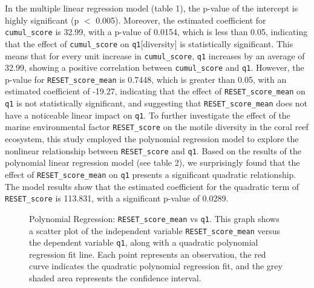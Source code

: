 \documentclass[a4paper, 11]{article}
\begin{document}
In the multiple linear regression model (table 1), the p-value of the intercept is highly significant (p $<$ 0.005). Moreover, the estimated coefficient for \texttt{cumul\_score} is 32.99, with a p-value of 0.0154, which is less than 0.05, indicating that the effect of \texttt{cumul\_score} on \texttt{q1}[diversity] is statistically significant. This means that for every unit increase in \texttt{cumul\_score}, \texttt{q1} increases by an average of 32.99, showing a positive correlation between \texttt{cumul\_score} and \texttt{q1}. However, the p-value for \texttt{RESET\_score\_mean} is 0.7448, which is greater than 0.05, with an estimated coefficient of -19.27, indicating that the effect of \texttt{RESET\_score\_mean} on \texttt{q1} is not statistically significant, and suggesting that \texttt{RESET\_score\_mean} does not have a noticeable linear impact on \texttt{q1}. 
To further investigate the effect of the marine environmental factor \texttt{RESET\_score} on the motile diversity in the coral reef ecosystem, this study employed the polynomial regression model to explore the nonlinear relationship between \texttt{RESET\_score} and \texttt{q1}. Based on the results of the polynomial linear regression model (see table 2), we surprisingly found that the effect of \texttt{RESET\_score\_mean} on \texttt{q1} presents a significant quadratic relationship. The model results show that the estimated coefficient for the quadratic term of \texttt{RESET\_score} is 113.831, with a significant p-value of 0.0289.


\begin{figure}[H]
    \centering
    \caption{Polynomial Regression: \texttt{RESET\_score\_mean} vs \texttt{q1}. This graph shows a scatter plot of the independent variable \texttt{RESET\_score\_mean} versus the dependent variable \texttt{q1}, along with a quadratic polynomial regression fit line. Each point represents an observation, the red curve indicates the quadratic polynomial regression fit, and the grey shaded area represents the confidence interval.}
\end{figure}
\end{document}
